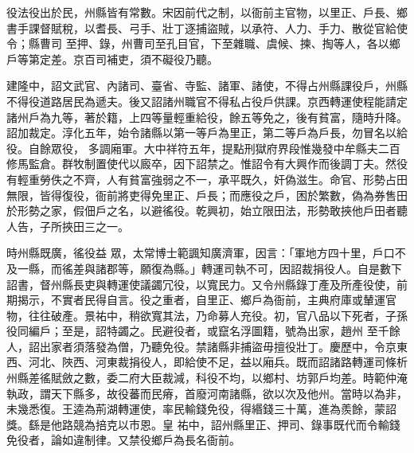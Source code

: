 
\begin{pinyinscope}

 役法役出於民，州縣皆有常數。宋因前代之制，以衙前主官物，以里正、戶長、鄉書手課督賦稅，以耆長、弓手、壯丁逐捕盜賊，以承符、人力、手力、散從官給使令；縣曹司
 至押、錄，州曹司至孔目官，下至雜職、虞候、揀、掏等人，各以鄉戶等第定差。京百司補吏，須不礙役乃聽。



 建隆中，詔文武官、內諸司、臺省、寺監、諸軍、諸使，不得占州縣課役戶，州縣不得役道路居民為遞夫。後又詔諸州職官不得私占役戶供課。京西轉運使程能請定諸州戶為九等，著於籍，上四等量輕重給役，餘五等免之，後有貧富，隨時升降。詔加裁定。淳化五年，始令諸縣以第一等戶為里正，第二等戶為戶長，勿冒名以給役。自餘眾役，
 多調廂軍。大中祥符五年，提點刑獄府界段惟幾發中牟縣夫二百修馬監倉。群牧制置使代以廄卒，因下詔禁之。惟詔令有大興作而後調丁夫。然役有輕重勞佚之不齊，人有貧富強弱之不一，承平既久，奸偽滋生。命官、形勢占田無限，皆得復役，衙前將吏得免里正、戶長；而應役之戶，困於繁數，偽為券售田於形勢之家，假佃戶之名，以避徭役。乾興初，始立限田法，形勢敢挾他戶田者聽人告，子所挾田三之一。



 時州縣既廣，徭役益
 眾，太常博士範諷知廣濟軍，因言：「軍地方四十里，戶口不及一縣，而徭差與諸郡等，願復為縣。」轉運司執不可，因詔裁捐役人。自是數下詔書，督州縣長吏與轉運使議蠲冗役，以寬民力。又令州縣錄丁產及所產役使，前期揭示，不實者民得自言。役之重者，自里正、鄉戶為衙前，主典府庫或輦運官物，往往破產。景祐中，稍欲寬其法，乃命募人充役。初，官八品以下死者，子孫役同編戶；至是，詔特蠲之。民避役者，或竄名浮圖籍，號為出家，趙州
 至千餘人，詔出家者須落發為僧，乃聽免役。禁諸縣非捕盜毋擅役壯丁。慶歷中，令京東西、河北、陜西、河東裁捐役人，即給使不足，益以廂兵。既而詔諸路轉運司條析州縣差徭賦斂之數，委二府大臣裁減，科役不均，以鄉村、坊郭戶均差。時範仲淹執政，謂天下縣多，故役蕃而民瘠，首廢河南諸縣，欲以次及他州。當時以為非，未幾悉復。王逵為荊湖轉運使，率民輸錢免役，得緡錢三十萬，進為羨餘，蒙詔獎。繇是他路競為掊克以市恩。皇
 祐中，詔州縣里正、押司、錄事既代而令輸錢免役者，論如違制律。又禁役鄉戶為長名衙前。




\end{pinyinscope}
